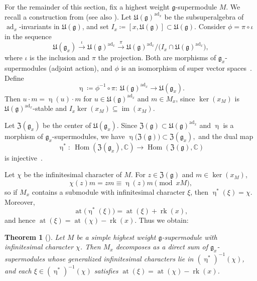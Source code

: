 \documentclass[11pt]{amsart}
\newcommand{\Hom}{\operatorname{Hom}}
\renewcommand{\Im}{\operatorname{im}}
\newcommand{\ad}{\operatorname{ad}}
\def\CC{{\mathbb C}}
\def\rk{{\operatorname{rk}}}
\def \at{{\operatorname{at}}}
\def\gg{{\mathfrak{g}}}
\def\UE{{\mathfrak U}}
\theoremstyle{plain}
\newtheorem{theorem}{Theorem}
\theoremstyle{remark}
\theoremstyle{definition}
\numberwithin{equation}{section}
\theoremstyle{remark}
\begin{document}
For the remainder of this section, fix a highest weight $\gg$-supermodule $M$. We recall a construction from
\cite[Section~6]{duflo2005associated} (see also \cite{serganova2011superdimension}).
Let $\mathfrak{U}(\gg)^{\ad_x}$ be the subsuperalgebra of $\ad_x$-invariants in $\mathfrak{U}(\gg)$, and set
$
 I_x\coloneqq [x,\mathfrak{U}(\gg)]\subset \mathfrak{U}(\gg).
$
Consider $\phi=\pi\circ\iota$ in the sequence
\begin{equation}
 \UE(\gg_x)\xrightarrow{\ \iota\ } \mathfrak{U}(\gg)^{\ad_x}\xrightarrow{\ \pi\ }
 \mathfrak{U}(\gg)^{\ad_x}/\bigl(I_x\cap \mathfrak{U}(\gg)^{\ad_x}\bigr),
\end{equation}
where $\iota$ is the inclusion and $\pi$ the projection. Both are morphisms of $\gg_x$-supermodules (adjoint action), and $\phi$ is an isomorphism of super vector spaces~\cite[Lemma~6.6]{duflo2005associated}. Define
\begin{equation}\label{eq::definition_upeta}
 \upeta\coloneqq \phi^{-1}\circ\pi:\ \mathfrak{U}(\gg)^{\ad_x}\to \UE(\gg_x).
\end{equation}
Then $u\cdot m=\upeta(u)\cdot m$ for $u\in \mathfrak{U}(\gg)^{\ad_x}$ and $m\in M_x$, since $\ker(x_M)$ is
$\mathfrak{U}(\gg)^{\ad_x}$-stable and $I_x\ker(x_M)\subseteq \Im(x_M)$.

Let $\mathfrak{Z}(\gg_x)$ be the center of $\UE(\gg_x)$. Since $\mathfrak Z(\gg)\subset \mathfrak{U}(\gg)^{\ad_x}$ and $\upeta$
is a morphism of $\gg_x$-supermodules, we have $\upeta\bigl(\mathfrak Z(\gg)\bigr)\subset \mathfrak Z(\gg_x),
$
and the dual map
\begin{equation}
 \upeta^{*}:\ \Hom(\mathfrak Z(\gg_x),\CC)\to \Hom(\mathfrak Z(\gg),\CC)
\end{equation}
is injective~\cite[Theorem~6.11]{duflo2005associated}.

Let $\chi$ be the infinitesimal character of $M$. For $z\in\mathfrak Z(\gg)$ and $m\in\ker(x_M)$,
\begin{equation}
 \chi(z)m=zm\equiv \upeta(z)m \pmod{xM},
\end{equation}
so if $M_x$ contains a submodule with infinitesimal character $\xi$, then $\upeta^{*}(\xi)=\chi$. Moreover,
\begin{equation}
 \at\bigl(\upeta^{*}(\xi)\bigr)=\at(\xi)+\rk(x),
\end{equation}
and hence $\at(\xi)=\at(\chi)-\rk(x)$. Thus we obtain:

\begin{theorem}[{\cite[Theorem~2.1]{serganova2011superdimension}}]\label{thm::DScharacter}
Let $M$ be a simple highest weight $\gg$-supermodule with infinitesimal character $\chi$.
Then $M_x$ decomposes as a direct sum of $\gg_x$-supermodules whose generalized infinitesimal characters lie in
$(\upeta^{*})^{-1}(\chi)$, and each $\xi\in(\upeta^{*})^{-1}(\chi)$ satisfies $\at(\xi)=\at(\chi)-\rk(x)$.
\end{theorem}
\end{document}
